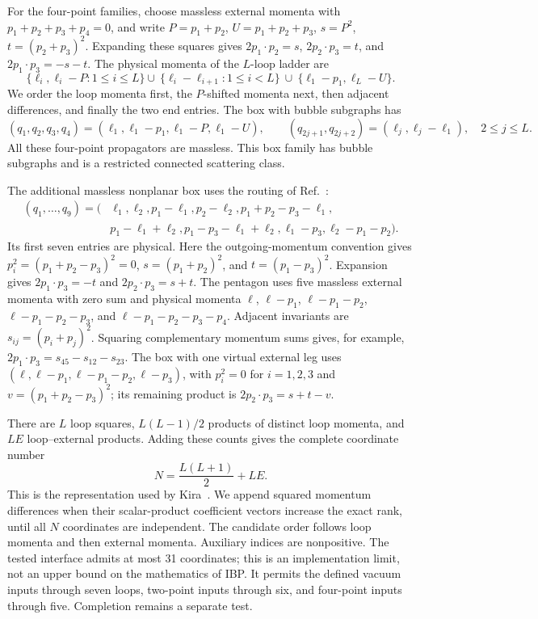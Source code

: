 For the four-point families, choose massless external momenta with $p_1+p_2+p_3+p_4=0$, and write $P=p_1+p_2$, $U=p_1+p_2+p_3$, $s=P^2$, $t=(p_2+p_3)^2$. Expanding these squares gives $2p_1\cdot p_2=s$, $2p_2\cdot p_3=t$, and $2p_1\cdot p_3=-s-t$. The physical momenta of the $L$-loop ladder are
\begin{equation}
 \{\ell_i,\ell_i-P:1\leq i\leq L\} \cup\
 \{\ell_i-\ell_{i+1}:1\leq i<L\}\ \cup\
 \{\ell_1-p_1,\ell_L-U\}.
 \label{project:eq:ladder-new}
\end{equation}
We order the loop momenta first, the $P$-shifted momenta next, then adjacent differences, and finally the two end entries. The box with bubble subgraphs has
\begin{equation}
 (q_1,q_2,q_3,q_4)=(\ell_1,\ell_1-p_1,\ell_1-P,\ell_1-U),\qquad
 (q_{2j+1},q_{2j+2})=(\ell_j,\ell_j-\ell_1),\quad 2\leq j\leq L.
 \label{project:eq:bubbles-new}
\end{equation}
All these four-point propagators are massless. This box family has bubble subgraphs and is a restricted connected scattering class.

The additional massless nonplanar box uses the routing of Ref.~\cite{KiraOriginal}:
\begin{align}
 (q_1,\ldots,q_9)=(&\ell_1,\ell_2,p_1-\ell_1,p_2-\ell_2,
 p_1+p_2-p_3-\ell_1,\nonumber\\
 &p_1-\ell_1+\ell_2,p_1-p_3-\ell_1+\ell_2,
 \ell_1-p_3,\ell_2-p_1-p_2).
 \label{project:eq:nonplanar-new}
\end{align}
Its first seven entries are physical. Here the outgoing-momentum convention gives $p_i^2=(p_1+p_2-p_3)^2=0$, $s=(p_1+p_2)^2$, and $t=(p_1-p_3)^2$. Expansion gives $2p_1\cdot p_3=-t$ and $2p_2\cdot p_3=s+t$. The pentagon uses five massless external momenta with zero sum and physical momenta $\ell$, $\ell-p_1$, $\ell-p_1-p_2$, $\ell-p_1-p_2-p_3$, and $\ell-p_1-p_2-p_3-p_4$. Adjacent invariants are $s_{ij}=(p_i+p_j)^2$. Squaring complementary momentum sums gives, for example, $2p_1\cdot p_3=s_{45}-s_{12}-s_{23}$. The box with one virtual external leg uses $(\ell,\ell-p_1,\ell-p_1-p_2,\ell-p_3)$, with $p_i^2=0$ for $i=1,2,3$ and $v=(p_1+p_2-p_3)^2$; its remaining product is $2p_2\cdot p_3=s+t-v$.

There are $L$ loop squares, $L(L-1)/2$ products of distinct loop momenta, and $LE$ loop--external products. Adding these counts gives the complete coordinate number
\begin{equation}
 N=\frac{L(L+1)}2+LE.
 \label{project:eq:count-new}
\end{equation}
This is the representation used by Kira~\cite{Kira3}. We append squared momentum differences when their scalar-product coefficient vectors increase the exact rank, until all $N$ coordinates are independent. The candidate order follows loop momenta and then external momenta. Auxiliary indices are nonpositive. The tested interface admits at most 31 coordinates; this is an implementation limit, not an upper bound on the mathematics of IBP. It permits the defined vacuum inputs through seven loops, two-point inputs through six, and four-point inputs through five. Completion remains a separate test.

